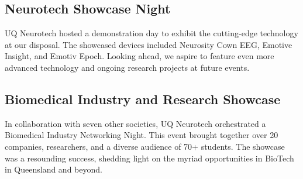 \documentclass[a4paper,12pt]{report}
\begin{document}
\begin{figure}[H]
\begin{subfigure}{0.32\linewidth}
    \end{subfigure}
\end{figure}

\vspace{-2cm}

\subsection{Neurotech Showcase Night}
UQ Neurotech hosted a demonstration day to exhibit the cutting-edge technology at
our disposal. The showcased devices included Neurosity Cown EEG, Emotive Insight,
and Emotiv Epoch. Looking ahead, we aspire to feature even more advanced
technology and ongoing research projects at future events.

\vspace{-1.8cm}

\subsection{Biomedical Industry and Research Showcase}
In collaboration with seven other societies, UQ Neurotech orchestrated a Biomedical
Industry Networking Night. This event brought together over 20 companies,
researchers, and a diverse audience of 70+ students. The showcase was a resounding
success, shedding light on the myriad opportunities in BioTech in Queensland and
beyond.
\end{document}
